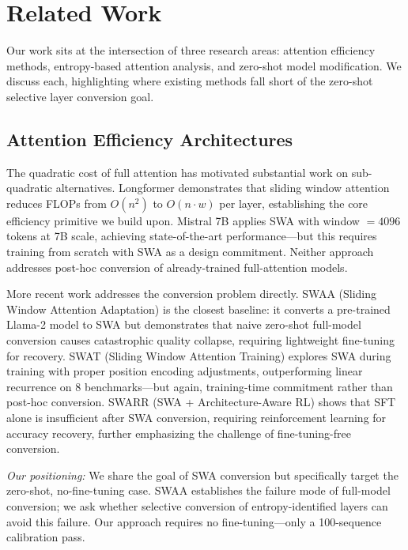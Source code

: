 \section{Related Work}
\label{sec:related}

Our work sits at the intersection of three research areas: attention efficiency methods, entropy-based attention analysis, and zero-shot model modification. We discuss each, highlighting where existing methods fall short of the zero-shot selective layer conversion goal.

\subsection{Attention Efficiency Architectures}

The quadratic cost of full attention has motivated substantial work on sub-quadratic alternatives. Longformer \cite{Beltagy2020Longformer} demonstrates that sliding window attention reduces FLOPs from $O(n^2)$ to $O(n \cdot w)$ per layer, establishing the core efficiency primitive we build upon. Mistral 7B \cite{Jiang2023Mistral} applies SWA with window $= 4096$ tokens at 7B scale, achieving state-of-the-art performance---but this requires training from scratch with SWA as a design commitment. Neither approach addresses post-hoc conversion of already-trained full-attention models.

More recent work addresses the conversion problem directly. SWAA (Sliding Window Attention Adaptation) \cite{Yu2025SWAA} is the closest baseline: it converts a pre-trained Llama-2 model to SWA but demonstrates that naive zero-shot full-model conversion causes catastrophic quality collapse, requiring lightweight fine-tuning for recovery. SWAT (Sliding Window Attention Training) \cite{Fu2025Sliding} explores SWA during training with proper position encoding adjustments, outperforming linear recurrence on 8 benchmarks---but again, training-time commitment rather than post-hoc conversion. SWARR (SWA + Architecture-Aware RL) \cite{Liu2026Architecture} shows that SFT alone is insufficient after SWA conversion, requiring reinforcement learning for accuracy recovery, further emphasizing the challenge of fine-tuning-free conversion.

\textit{Our positioning:} We share the goal of SWA conversion but specifically target the zero-shot, no-fine-tuning case. SWAA establishes the failure mode of full-model conversion; we ask whether selective conversion of entropy-identified layers can avoid this failure. Our approach requires no fine-tuning---only a 100-sequence calibration pass.

